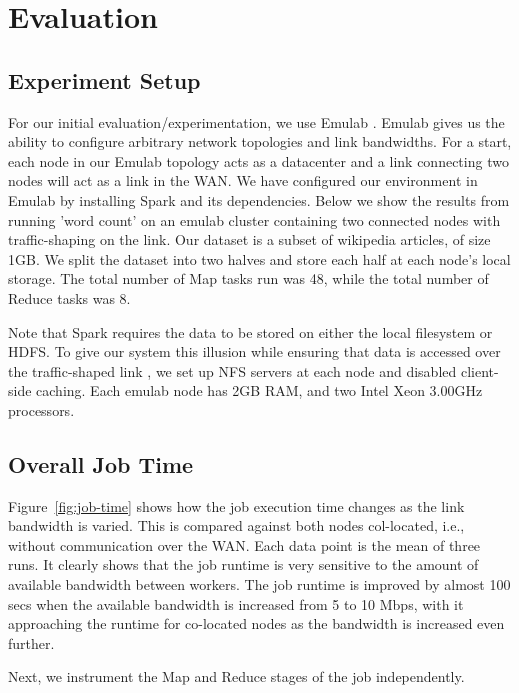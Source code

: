 \section{Evaluation}

\subsection{Experiment Setup}
For our initial evaluation/experimentation, we use Emulab \cite{2}. Emulab gives us the ability to configure arbitrary network topologies and link bandwidths. For a start, each node in our Emulab topology acts as a datacenter and a link connecting two nodes will act as a link in the WAN. We have configured our environment in Emulab by installing Spark and its dependencies.  Below we show the results from running 'word count' on an emulab cluster containing two connected nodes with traffic-shaping on the link. Our dataset is a subset of wikipedia articles, of size 1GB. We split the dataset into two halves and store each half at each node's local storage. The total number of Map tasks run was 48, while the total number of Reduce tasks was 8. 

Note that Spark requires the data to be stored on either the local filesystem or HDFS. To give our system this illusion while ensuring that data is accessed over the traffic-shaped link , we set up NFS servers at each node and disabled client-side caching. Each emulab node has 2GB RAM, and two Intel Xeon 3.00GHz processors.

\subsection{Overall Job Time}
Figure~\ref{fig:job-time} shows how the job execution time changes as the link bandwidth is varied. This is compared against both nodes col-located, i.e., without communication over the WAN. Each data point is the mean of three runs. It clearly shows that the job runtime is very sensitive to the amount of available bandwidth between workers. The job runtime is improved by almost 100 secs when the available bandwidth is increased from 5 to 10 Mbps, with it approaching the runtime for co-located nodes as the bandwidth is increased even further.  

Next, we instrument the Map and Reduce stages of the job independently.


